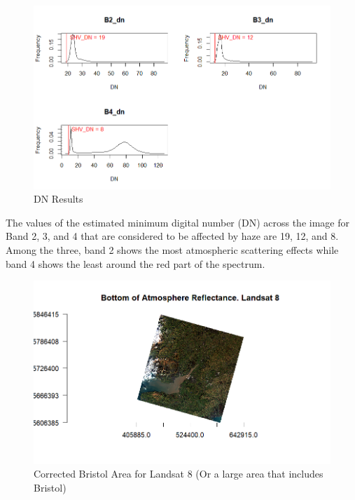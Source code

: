\documentclass[
  letterpaper,
  DIV=11,
  numbers=noendperiod]{scrreprt}
\begin{document}
\begin{figure}

{\centering \includegraphics[width=6.73958in,height=\textheight]{images/wk3/wk3_01_band_2to4.png}

}

\caption{DN Results}

\end{figure}

The values of the estimated minimum digital number (DN) across the image
for Band 2, 3, and 4 that are considered to be affected by haze are 19,
12, and 8. Among the three, band 2 shows the most atmospheric scattering
effects while band 4 shows the least around the red part of the
spectrum.

\begin{figure}

{\centering \includegraphics[width=6.75in,height=\textheight]{images/wk3/000010.png}

}

\caption{Corrected Bristol Area for Landsat 8 (Or a large area that
includes Bristol)}

\end{figure}
\end{document}
